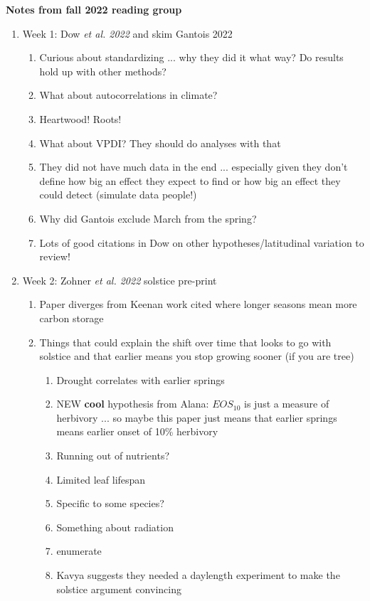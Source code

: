 \documentclass[11pt,letter]{article}
\begin{document}

\renewcommand{\refname}{\CHead{}}

{\bf Notes from fall 2022 reading group}\\
\begin{enumerate}
\item Week 1: Dow \emph{et al. 2022} and skim Gantois 2022
\begin{enumerate}
\item Curious about standardizing ... why they did it what way? Do results hold up with other methods?
\item What about autocorrelations in climate?
\item Heartwood! Roots!
\item What about VPDI? They should do analyses with that
\item They did not have much data in the end ... especially given they don't define how big an effect they expect to find or how big an effect they could detect (simulate data people!)
\item Why did Gantois exclude March from the spring?
\item Lots of good citations in Dow on other hypotheses/latitudinal variation to review!
\end{enumerate}
\item Week 2: Zohner \emph{et al. 2022} solstice pre-print
\begin{enumerate}
\item Paper diverges from Keenan work cited where longer seasons mean more carbon storage
\item Things that could explain the shift over time that looks to go with solstice and that earlier means you stop growing sooner (if you are  tree)
\begin{enumerate}
\item Drought correlates with earlier springs
\item NEW {\bf cool} hypothesis from Alana: $EOS_{10}$ is just a measure of herbivory ... so maybe this paper just means that earlier springs means earlier onset of 10\% herbivory 
\item Running out of nutrients?
\item Limited leaf lifespan
\item Specific to some species?
\item Something about radiation
\item{enumerate}
\item Kavya suggests they needed a daylength experiment to make the solstice argument convincing 

\end{enumerate}
\end{enumerate}
\end{enumerate}
\end{document}
